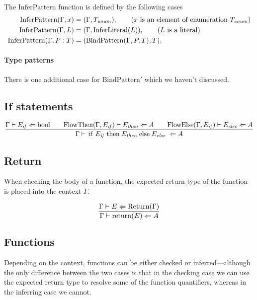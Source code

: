 The $\mathrm{InferPattern}$ function is defined by the following cases
\begin{align*}
  \mathrm{InferPattern}(\Gamma,x) &= (\Gamma, T_{\mathit{enum}}), \tag{$x$ is an element of enumeration $T_{\mathit{enum}}$}\\
  \mathrm{InferPattern}(\Gamma,L) &= (\Gamma, \mathrm{InferLiteral}(L)), \tag{$L$ is a literal}\\
  \mathrm{InferPattern}(\Gamma,\msail{$P\;$ : $\;T$}) &= (\mathrm{BindPattern}(\Gamma,P,T), T).
\end{align*}

\paragraph{Type patterns} There is one additional case for $\mathrm{BindPattern}'$ which we haven't discussed. 

\subsection{If statements}

\[
\frac{\tcheck{\Gamma}{E_{\mathit{if}}}{\msail{bool}}
      \qquad
      \tcheck{\mathrm{FlowThen}(\Gamma, E_{\mathit{if}})}{E_{\mathit{then}}}{A}
      \qquad
      \tcheck{\mathrm{FlowElse}(\Gamma, E_{\mathit{if}})}{E_{\mathit{else}}}{A}}
     {\tcheck{\Gamma}{\msail{if $\;E_{\mathit{if}}\;$ then $\;E_{\mathit{then}}\;$ else $\;E_{\mathit{else}}\;$}}{A}}
\]

\subsection{Return}

When checking the body of a function, the expected return type of the
function is placed into the context $\Gamma$.

\[
\frac{\tcheck{\Gamma}{E}{\mathrm{Return}(\Gamma)}}
     {\tcheck{\Gamma}{\msail{return($E$)}}{A}}
\]

\subsection{Functions}

Depending on the context, functions can be either checked or
inferred---although the only difference between the two cases is that
in the checking case we can use the expected return type to resolve
some of the function quantifiers, whereas in the inferring case we
cannot.

